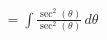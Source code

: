 \documentclass[preview]{standalone}
\begin{document}
\begin{align*}
= \int \frac{\sec^2(\theta)}{\sec^2(\theta)} \, d\theta
\end{align*}
\end{document}
